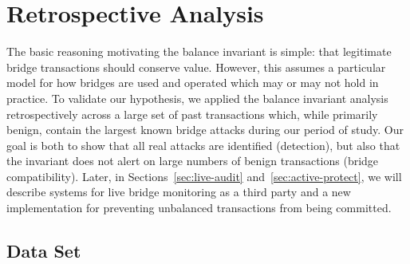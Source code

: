 \section{Retrospective Analysis}
\label{sec:retro-results}


The basic reasoning motivating the balance invariant is simple: that
legitimate bridge transactions should conserve value.  However, this
assumes a particular model for how bridges are used and operated which
may or may not hold in practice.  To validate our hypothesis, we applied
the balance invariant analysis retrospectively across a large set of
past transactions which, while primarily benign, contain the largest
known bridge attacks during our period of study.  Our goal is both to
show that all real attacks are identified (detection), but also that
the invariant does not alert on large numbers of benign transactions
(bridge compatibility).  Later, in Sections~\ref{sec:live-audit}
and~\ref{sec:active-protect}, we will describe systems for live bridge
monitoring as a third party and a new implementation for preventing
unbalanced transactions from being committed.



\subsection{Data Set}
\label{sec:retro-data}

